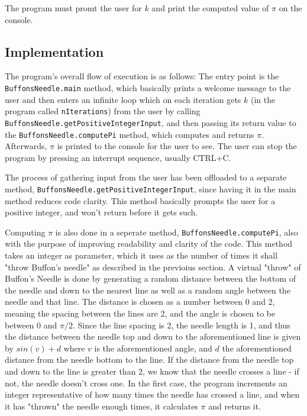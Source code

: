 \documentclass{scrartcl}
\newcommand\code[1]{\texttt{#1}}
\begin{document}
The program must promt the user for $k$ and print the computed
value of $\pi$  on the console.

\subsection*{Implementation}
The program's overall flow of execution is as follows:
The entry point is the \code{BuffonsNeedle.main} method, which
basically prints a welcome message to the user and then enters an
infinite loop which on each iteration gets $k$ (in the program
called \code{nIterations}) from the user by calling
\code{BuffonsNeedle.getPositiveIntegerInput}, and then passing
its return value to the \code{BuffonsNeedle.computePi} method, which
computes and returns $\pi$.  Afterwards, $\pi$  is printed to the
console for the user to see. The user can stop the program by pressing
an interrupt sequence, usually CTRL+C.

The process of gathering input from the user has been offloaded to a
separate method, \code{BuffonsNeedle.getPositiveIntegerInput}, since
having it in the main method reduces code clarity. This method
basically prompts the user for a positive integer, and won't return
before it gets such.

Computing $\pi$  is also done in a seperate method, \code{BuffonsNeedle.computePi},
also with the purpose of improving readability and clarity of the code.
This method takes an integer as parameter, which it uses as the number of times it shall
"throw Buffon's needle" as described in the previoius section. A virtual
"throw" of Buffon's Needle is done by generating a random distance between the bottom
of the needle and down to the nearest line as well as a random angle between the
needle and that line. The distance is chosen as a number between 0 and 2, meaning the
spacing between the lines are 2, and the angle is chosen to be between 0 and $\pi/2$.
Since the line spacing is 2, the needle length is 1, and thus the distance between
the needle top and down to the aforementioned line is given by $sin(v)+d$ where $v$ is the
aforementioned angle, and $d$ the aforementioned distance from the needle bottom to the line.
If the distance from the needle top and down to the line is greater than 2,
we know that the needle crosses a line - if not, the needle doesn't cross one.
In the first case, the program increments an integer representative of how many
times the needle has crossed a line, and when it has "thrown" the needle
enough times, it calculates $\pi$  and returns it.
\end{document}

